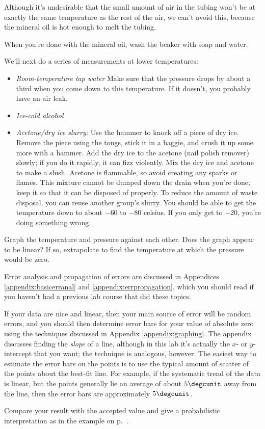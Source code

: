 Although it's undesirable that the small amount of air in the tubing
won't be at exactly the same temperature as the rest of the air, we can't
avoid this, because the mineral oil is hot enough to melt the tubing.

When you're done with the mineral oil, wash the beaker with soap and water.

We'll next do a series of measurements at lower temperatures:

\begin{itemize}
\item \emph{Room-temperature tap water} Make sure that the pressure
drops by about a third when you come down to this temperature. If it
doesn't, you probably have an air leak.

\item \emph{Ice-cold alcohol}

\item \emph{Acetone/dry ice slurry:}
Use the hammer to knock off a piece of dry ice. Remove the piece
using the tongs, stick it in a baggie, and crush it up some more
with a hammer.
Add the dry ice to the acetone (nail polish remover) slowly; if you
do it rapidly, it can fizz violently.
Mix the dry ice and acetone to make a slush.
Acetone is flammable, so avoid creating any sparks or flames.
This mixture cannot be dumped down the drain when you're done;
keep it so that it can be disposed of properly. To reduce the amount
of waste disposal, you can reuse another group's slurry.
You should be able to get the temperature down to about $-60$ to
$-80$ celsius. If you only get to $-20$, you're doing something wrong.
\end{itemize}

\analysis

Graph the temperature and pressure against each other. Does
the graph appear to be linear? If so, extrapolate to find
the temperature at which the pressure would be zero. 

Error analysis and propagation of errors are discussed in
Appendices \ref{appendix:basicerranal} and \ref{appendix:errpropagation},
which you should read if you haven't had a previous lab course that
did these topics.

If your data are nice and linear, then your main source of
error will be random errors, and you should then determine
error bars for your value of absolute zero using the
techniques discussed in Appendix \ref{appendix:graphing}.
The appendix discusses finding the \emph{slope} of a line,
although in this lab it's actually the $x$- or $y$-intercept that you want;
the technique is analogous, however.
The easiest way to estimate the error bars on the points
is to use the typical amount of scatter of the points about
the best-fit line. For example, if the systematic trend of the
data is linear, but the points generally lie an average of
about $5\degcunit$ away from the line, then the error bars
are approximately $5\degcunit$.

Compare your result with the accepted value and give a probabilistic
interpretation as in the example on p.~\pageref{probability-of-deviations}.
